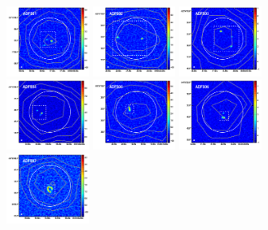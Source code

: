\documentclass[iop]{emulateapj}
\begin{document}
\begin{figure}[!tbp] 
    \begin{centering}
\includegraphics[width=0.245\textwidth]{../Figures/overlays/ADFS01_870_250.pdf}
\includegraphics[width=0.245\textwidth]{../Figures/overlays/ADFS02_870_250.pdf}
\includegraphics[width=0.245\textwidth]{../Figures/overlays/ADFS03_870_250.pdf}
\includegraphics[width=0.245\textwidth]{../Figures/overlays/ADFS04_870_250.pdf}
\includegraphics[width=0.245\textwidth]{../Figures/overlays/ADFS05_870_250.pdf}
\includegraphics[width=0.245\textwidth]{../Figures/overlays/ADFS06_870_250.pdf}
\includegraphics[width=0.245\textwidth]{../Figures/overlays/ADFS07_870_250.pdf}

\end{centering}
\end{figure}
\end{document}
